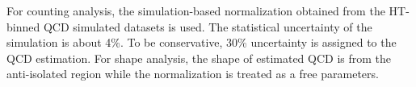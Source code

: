 For counting analysis, the simulation-based normalization obtained from the HT-binned QCD simulated datasets is used. The statistical uncertainty of the simulation is about 4\%. To be conservative, 30\% uncertainty is assigned to the QCD estimation. For shape analysis, the shape of estimated QCD is from the anti-isolated region while the normalization is treated as a free parameters.













